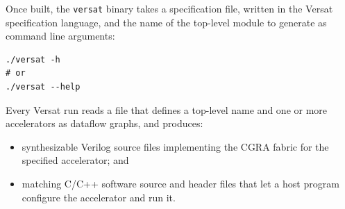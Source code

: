 %

Once built, the \texttt{versat} binary takes a specification file, written
in the Versat specification language, and the name of the top-level module
to generate as command line arguments:

\begin{verbatim}
./versat -h
# or
./versat --help
\end{verbatim}

Every Versat run reads a file that defines a top-level name and one or more
accelerators as dataflow graphs, and produces:

\begin{itemize}
  \itemsep-0.5em
  \item synthesizable Verilog source files implementing the CGRA fabric for
    the specified accelerator; and
  \item matching C/C++ software source and header files that let a host
    program configure the accelerator and run it.
\end{itemize}
